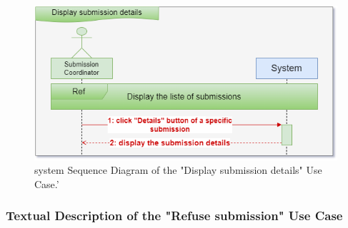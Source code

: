 \begin{figure}[h!]
    \centering
    \includegraphics[width=1\textwidth]{figures/seqdisplay_submission_details.png}
    \caption{system Sequence Diagram of the "Display submission details" Use Case.'}
\end{figure}
\clearpage


\subsubsection{Textual Description of the "Refuse submission" Use Case}

